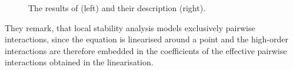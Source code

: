 \begin{itemize}
    \begin{figure}[h!]
	\begin{center}
        \caption{The results of \cite{Bairey2016} (left) and their description (right).} 
    	\label{Bairey_res}
    \end{center}
    \end{figure}
    

They remark, that local stability analysis models exclusively pairwise interactions, since the equation is linearised around a point and the high-order interactions are therefore embedded in the coefficients of the effective pairwise interactions obtained in the linearisation.


\end{itemize}
